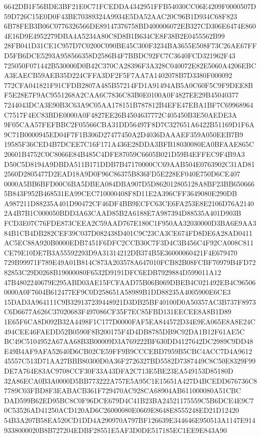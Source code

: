 \documentclass[UTF8,fontset=fandol,zihao=-4,a4paper]{ctexart}
\begin{document}
{{6642DB1F56BDE3BF21E0C71FCEDDA4342951FFB54030CC06E4209F0000507D59D726C15E0D0F43BE70389324A9934E5DA52AAC20C96B1D934C68F823
6B78FEB3B06C0776326566DE89147376758BD400006072EB327CD306E6474E8604E16D9E4952279DBA4A5234A80C8D8B1B634CE8F38B2E0455562B99
28FB041D31CE1C957D7C0200C090BE45C300F3234BA3655E508F73C26AE67FFD5FB6DCE5293A958566358D2586B4F7BBDC92FC7C3640FCD321962F43
725050F071442B530000D0B42C370CA28396F3A328C040072E82E5060A4206EBCA3EAECB59AEB35D224CFFA3DF2F5F7AA7A1402078B7D3380F000092
772CFA041821F91CFDB2807A485B57214FD1A91494AB5A0C60F5C9F9DEE8BF5E28E7F9AC9551268A2CAA6C7836C83B0E0100A0F4827EE29B45040377
7244043DCA3E90B3C63A9C05AA178151B787812B4EFE47EBA1BF7C69968964C7517F4EC83BDE0000A0F4827EE26B4504637772C405450B3E50AEDE3A
9F05CAA57FEFBBC2F05566CBA31DD56497F8D7C327651A6422B51169D1F6A9C71B0000945ED04F7F1B306D27477450A2D4036DAAAEF359A050EEB7B9
19585F36CED4B7DCEE7C16F171A436E28DDA3BFB18030080EA0BFAAE865C20601B4752C0C8066E84B485C4DFE87059C6605B021D59B4EFFEC9F4B9A3
D50C5D8194A9DBDA511B171DDB7B47170000CC69AAB504E0763902C31AD812560D2805477D2EAD18A9D0F96C86375B836FD5E228EF040E750D6CE407
0000A5BB6BFD00C6BA5DBEA084DBA907D5D862012805128A8BF23BB6506665B843F952B468531EA99CEC710000408F8D11E2A396CFF3649080E290DB
A987211D88235A401D90472CF46DF4BB9ECFC63CE6FA253E8E2106D76A21402A4B7B1C000050BDD3A63CAAD85B2A6188E7A987394D88535A401D903B
FCD3E07C76FDE873CEEA2C59AAD767E180C1F950AA32030000D3BA6E9AA384B1CB4DB282CEF39C037D082438D401C9C23CA3CE674FD8DE6A28AD0411
AC5EC88A920B0000EDB7451F6DFC2CCB30C7F3D4C3B456C4F92CA008C811CE79E10DE7B3A55592293D9A31314212DB374B5E36000060421F4E679470
729B99971F789E49A01B814C873A203578A647010FCB82B08FCBF70979B4FD7282853C29D0268B19000080F6532D9191DFC6EDB7929884D599011A12
47B4802240679E295ABD03AE15FCFAAD75B06B069DBEB4C021492EB4C965060000A0F7604B612477EF9C0D258651A58989B1DD88235A4005900E6CE3
15DAD3A964111C9B329137239448921D3DB25BF40100D0A50357AC3B737F8973C6D6677A626C37020683F497086CF35F7EC85FBD131EECEE8A8B1D89
1E65F6CA8D092B32A4498F1C177D0000FAF5EA844572D34E9EA065E8A8E24C494CEE46FAEDD52B0590F8B200175F4D4DB8785DB9C92DA1B12F61AE5C
BC49C5104952A67AA68B3B00009D3A769222BF630DD4127642DC2989C9DD48E49B4AF9AFA52640D6CB02CE59FF9B9CCCEBD7959B5CBC4ACC7D4A9612
45557C513D71AA27BBB80300D0A36F2726327BD5582D7387449C8C50E8329F99DE7A764E83AC9708CCF30F33A43DFA2C713E5BE23EA549153D85180D
32A86ECA0B3A0000D5BB773222A757E5A95C1E15651A427D4BCEDD676736C87789C03FBD8F3EABACB361F729470AC928CA68904AB611000080A51CBC
DAD599B62ED95BC8C0F96DCE679D4C41B23BA24521175559C5B6DCE4E9C70C53526AD41250ACD120AD6C26000080E0669E8648E8555248ED21D12420
54B3A207B58EA520CD1DD4A290970A797BF126639E344646E950513A1147E9149338000020B8B727204EDBF28551E5AF3D0DE517185EC1EE9E843A90
}}
\end{document}
